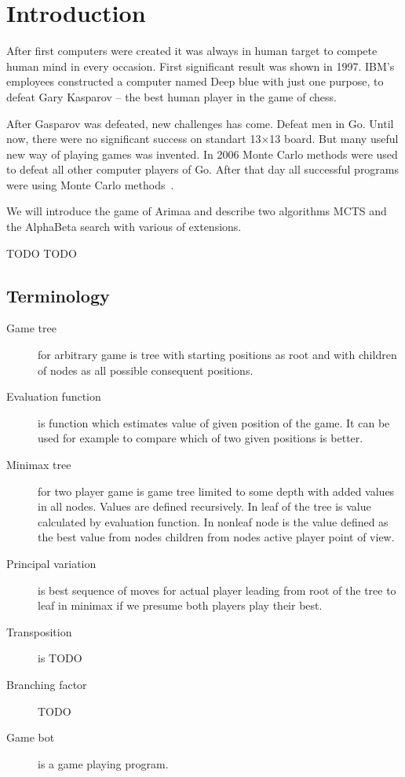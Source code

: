 \chapter{Introduction}
After first computers were created it was always in human target to compete
human mind in every occasion. First significant result was shown in 1997. IBM's
employees constructed a computer named Deep blue with just one purpose, to
defeat Gary Kasparov -- the best human player in the game of chess.

After Gasparov was defeated, new challenges has come. Defeat men in Go. Until
now, there were no significant success on standart 13$\times$13 board. But many
useful new way of playing games was invented. In 2006 Monte Carlo methods were
used to defeat all other computer players of Go. After that day all successful
programs were using Monte Carlo methods~\cite{MoGo}.

We will introduce the game of Arimaa and describe two algorithms \ac{MCTS} and
the AlphaBeta search with various of extensions.

\cite{arimaa.com}

TODO TODO

\section{Terminology}
\begin{description}
\item[Game tree] for arbitrary game is tree with starting positions as root and
   with children of nodes as all possible consequent positions.
\item[Evaluation function] is function which estimates value of given position of the game. It can be used for example to compare which of two given positions is better.
\item[Minimax tree] for two player game is game tree limited to some depth with
added values in all nodes. Values are defined recursively. In leaf of the tree
is value calculated by evaluation function. In nonleaf node is the value
defined as the best value from nodes children from nodes active player point
of view.
\item[Principal variation] is best sequence of moves for actual player leading
from root of the tree to leaf in minimax if we presume both players play their
best.
\item[Transposition] is TODO
\item[Branching factor] TODO
\item[Game bot] is a game playing program.
\end{description}

